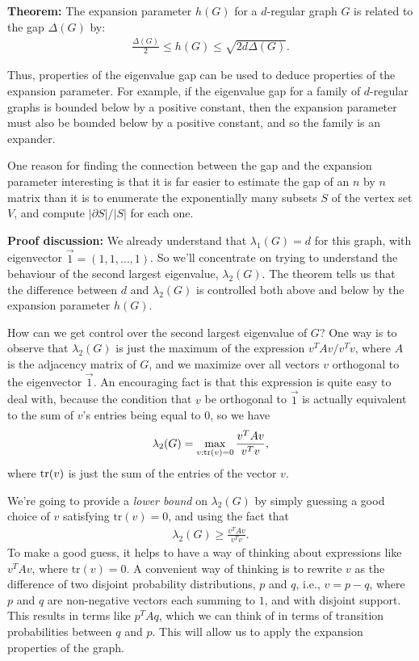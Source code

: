 \documentclass[12pt]{article}
\begin{document}
\textbf{Theorem:} The expansion parameter $h(G)$ for a $d$-regular
graph $G$ is related to the gap $\Delta(G)$ by:
\begin{eqnarray}
  \frac{\Delta(G)}{2} \leq h(G) \leq \sqrt{2d \Delta(G)}.
\end{eqnarray}

Thus, properties of the eigenvalue gap can be used to deduce
properties of the expansion parameter.  For example, if the eigenvalue
gap for a family of $d$-regular graphs is bounded below by a positive
constant, then the expansion parameter must also be bounded below by a
positive constant, and so the family is an expander.

One reason for finding the connection between the gap and the
expansion parameter interesting is that it is far easier to estimate
the gap of an $n$ by $n$ matrix than it is to enumerate the
exponentially many subsets $S$ of the vertex set $V$, and compute
$|\partial S|/|S|$ for each one.

\textbf{Proof discussion:} We already understand that $\lambda_1(G) =
d$ for this graph, with eigenvector $\vec 1 = (1,1,\ldots,1)$.  So
we'll concentrate on trying to understand the behaviour of the second
largest eigenvalue, $\lambda_2(G)$.  The theorem tells us that the
difference between $d$ and $\lambda_2(G)$ is controlled both above and
below by the expansion parameter $h(G)$.

How can we get control over the second largest eigenvalue of $G$?  One
way is to observe that $\lambda_2(G)$ is just the maximum of the
expression $v^T A v / v^T v$, where $A$ is the adjacency matrix of
$G$, and we maximize over all vectors $v$ orthogonal to the
eigenvector $\vec 1$.  An encouraging fact is that this expression is
quite easy to deal with, because the condition that $v$ be orthogonal
to $\vec 1$ is actually equivalent to the sum of $v$'s entries being
equal to $0$, so we have
\begin{eqnarray}
  \lambda_2(G) = \max_{v: {\rm tr}(v) = 0} \frac{v^T A v}{v^T v},
\end{eqnarray}
where ${\rm tr}(v)$ is just the sum of the entries of the vector $v$.

We're going to provide a \emph{lower bound} on $\lambda_2(G)$ by
simply guessing a good choice of $v$ satisfying $\mbox{tr}(v) = 0$,
and using the fact that
\begin{eqnarray}
  \lambda_2(G) \geq \frac{v^T A v}{v^T v}.
\end{eqnarray}
To make a good guess, it helps to have a way of thinking about
expressions like $v^T A v$, where $\mbox{tr}(v) = 0$.  A convenient
way of thinking is to rewrite $v$ as the difference of two disjoint
probability distributions, $p$ and $q$, i.e., $v = p-q$, where $p$ and
$q$ are non-negative vectors each summing to $1$, and with disjoint
support.  This results in terms like $p^T A q$, which we can think of
in terms of transition probabilities between $q$ and $p$.  This will
allow us to apply the expansion properties of the graph.
\end{document}
